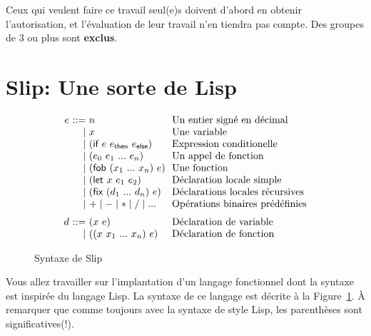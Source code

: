 \documentclass{article}
\begin{document}
Ceux qui veulent faire ce travail seul(e)s doivent d'abord en obtenir
l'autorisation, et l'évaluation de leur travail n'en tiendra pas compte.
Des groupes de 3 ou plus sont \textbf{exclus}.

\newpage
\section{Slip: Une sorte de Lisp}

\begin{figure}
  \begin{displaymath}
    \begin{array}{r@{~}r@{~}l@{~~}l}
      e &::=& n & \text{Un entier signé en décimal} \\
      &\mid& x & \text{Une variable}  \\
      &\mid& (\kw{if}~e~e_{\kw{then}}~e_{\kw{else}}) &
           \text{Expression conditionelle} \\
      &\mid& (e_0~e_1~...~e_n) &
           \text{Un appel de fonction} \\
      &\mid& (\kw{fob}~(x_1~...~x_n)~e) & \text{Une fonction} \\
      &\mid& (\kw{let}~x~e_1~e_2) &
           \text{Déclaration locale simple} \\
      &\mid& (\kw{fix}~(d_1~...~d_n)~e) &
           \text{Déclarations locales récursives} \\
      &\mid& + \mid - \mid * \mid / \mid ... &
           \text{Opérations binaires prédéfinies}
       \medskip \\
      d &::=& (x~e) & %
          \text{Déclaration de variable} \\
      &\mid& ((x~x_1~...~x_n)~e) &
           \text{Déclaration de fonction}
    \end{array}
  \end{displaymath}
  \caption{Syntaxe de Slip}
  \label{fig:syntaxe}
\end{figure}

Vous allez travailler sur l'implantation d'un langage fonctionnel dont la
syntaxe est inspirée du langage Lisp.  La syntaxe de ce langage est décrite
à la Figure~\ref{fig:syntaxe}.
À remarquer que comme toujours avec la syntaxe de style Lisp, les
parenthèses sont significatives({!}).
\end{document}

